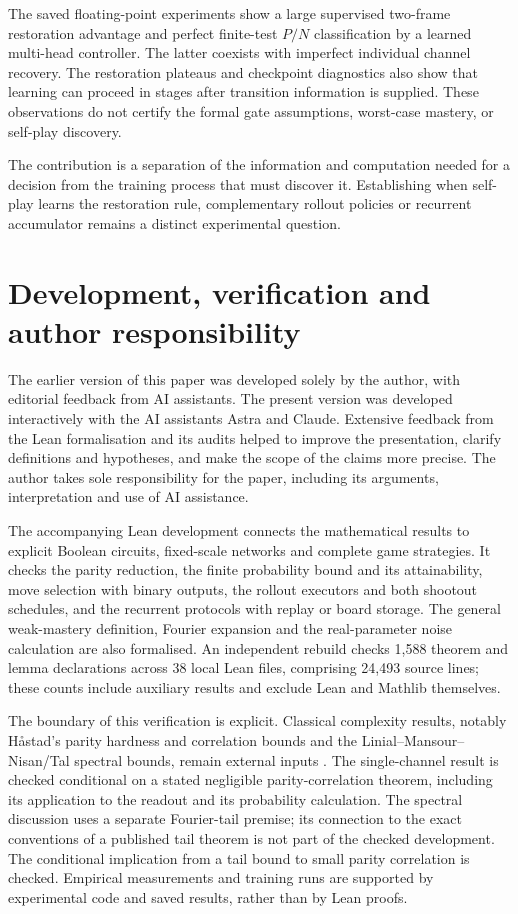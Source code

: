 \documentclass[11pt]{article}
\theoremstyle{plain}
\theoremstyle{definition}
\theoremstyle{remark}
\numberwithin{equation}{section}
\begin{document}
The saved floating-point experiments show a large supervised two-frame restoration advantage and perfect finite-test $P/N$ classification by a learned multi-head controller. The latter coexists with imperfect individual channel recovery. The restoration plateaus and checkpoint diagnostics also show that learning can proceed in stages after transition information is supplied. These observations do not certify the formal gate assumptions, worst-case mastery, or self-play discovery.

The contribution is a separation of the information and computation needed for a decision from the training process that must discover it. Establishing when self-play learns the restoration rule, complementary rollout policies or recurrent accumulator remains a distinct experimental question.

\section{Development, verification and author responsibility}
\label{sec:development}
\label{sec:verification}
The earlier version of this paper was developed solely by the author, with editorial feedback from AI assistants. The present version was developed interactively with the AI assistants Astra and Claude. Extensive feedback from the Lean formalisation and its audits helped to improve the presentation, clarify definitions and hypotheses, and make the scope of the claims more precise. The author takes sole responsibility for the paper, including its arguments, interpretation and use of AI assistance.

The accompanying Lean development \cite{riis2026lean} connects the mathematical results to explicit Boolean circuits, fixed-scale networks and complete game strategies. It checks the parity reduction, the finite probability bound and its attainability, move selection with binary outputs, the rollout executors and both shootout schedules, and the recurrent protocols with replay or board storage. The general weak-mastery definition, Fourier expansion and the real-parameter noise calculation are also formalised. An independent rebuild checks 1,588 theorem and lemma declarations across 38 local Lean files, comprising 24,493 source lines; these counts include auxiliary results and exclude Lean and Mathlib themselves.

The boundary of this verification is explicit. Classical complexity results, notably H{\aa}stad's parity hardness and correlation bounds and the Linial--Mansour--Nisan/Tal spectral bounds, remain external inputs \cite{hastad1986thesis,hastad2014correlation,linial1993constant,tal2015tight}. The single-channel result is checked conditional on a stated negligible parity-correlation theorem, including its application to the readout and its probability calculation. The spectral discussion uses a separate Fourier-tail premise; its connection to the exact conventions of a published tail theorem is not part of the checked development. The conditional implication from a tail bound to small parity correlation is checked. Empirical measurements and training runs are supported by experimental code and saved results, rather than by Lean proofs.
\end{document}
